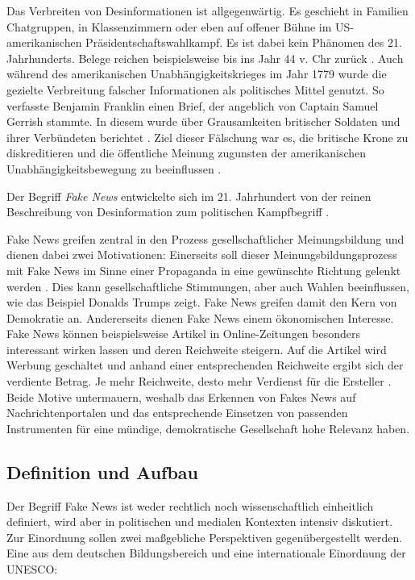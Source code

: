 Das Verbreiten von Desinformationen ist allgegenwärtig. Es geschieht in Familien Chatgruppen, in Klassenzimmern oder eben auf offener Bühne im US-amerikanischen 
Präsidentschaftswahlkampf. Es ist dabei kein Phänomen des 21. Jahrhunderts. Belege reichen beispielsweise bis ins Jahr 44 v. Chr zurück \cite{socsci9100185}.
Auch während des amerikanischen Unabhängigkeitskrieges im Jahr 1779 wurde die gezielte Verbreitung falscher Informationen als politisches Mittel genutzt. 
So verfasste Benjamin Franklin einen Brief, der angeblich von Captain Samuel Gerrish stammte. In diesem wurde über Grausamkeiten britischer Soldaten und ihrer 
Verbündeten berichtet \cite{Franklin1782}. Ziel dieser Fälschung war es, die britische Krone zu diskreditieren und die öffentliche Meinung zugunsten der amerikanischen 
Unabhängigkeitsbewegung zu beeinflussen \cite{Sharma:2024}.

Der Begriff \textit{Fake News} entwickelte sich im 21. Jahrhundert von der reinen Beschreibung von Desinformation zum politischen Kampfbegriff \cite{Ashish2024, buerker2022fakenews}.

Fake News greifen zentral in den Prozess gesellschaftlicher Meinungsbildung und dienen dabei zwei Motivationen: 
Einerseits soll dieser Meinungsbildungsprozess mit Fake News im Sinne einer Propaganda in eine gewünschte Richtung gelenkt werden \cite{buerker2022fakenews}. 
Dies kann gesellschaftliche Stimmungen, aber auch Wahlen beeinflussen, wie das Beispiel Donalds Trumps zeigt. Fake News greifen damit den Kern von Demokratie an. 
Andererseits dienen Fake News einem ökonomischen Interesse. Fake News können beispielsweise Artikel in Online-Zeitungen besonders interessant wirken lassen 
und deren Reichweite steigern. Auf die Artikel wird Werbung geschaltet und anhand einer entsprechenden Reichweite ergibt sich der verdiente Betrag. Je mehr Reichweite, desto mehr 
Verdienst für die Ersteller \cite{socsci9100185}. 
Beide Motive untermauern, weshalb das Erkennen von Fakes News auf Nachrichtenportalen und das entsprechende Einsetzen von passenden Instrumenten für eine mündige, demokratische Gesellschaft hohe Relevanz haben. 

\subsection{Definition und Aufbau}
\label{sec:wie_definieren_sich_fake_news}

Der Begriff Fake News ist weder rechtlich noch wissenschaftlich einheitlich definiert, wird aber in politischen und medialen Kontexten intensiv diskutiert. 
Zur Einordnung sollen zwei maßgebliche Perspektiven gegenübergestellt werden. Eine aus dem deutschen Bildungsbereich und eine internationale Einordnung der UNESCO:

